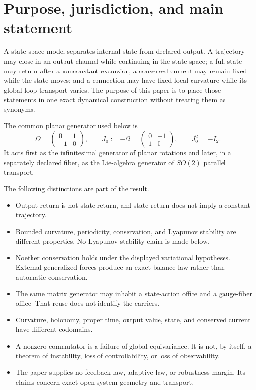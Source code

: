 \documentclass[11pt,letterpaper]{article}
\theoremstyle{dynamicsstyle}
\begin{document}
\tableofcontents
\clearpage

\section{Purpose, jurisdiction, and main statement}

A state-space model separates internal state from declared output.  A trajectory may close in an output channel while continuing in the state space; a full state may return after a nonconstant excursion; a conserved current may remain fixed while the state moves; and a connection may have fixed local curvature while its global loop transport varies.  The purpose of this paper is to place those statements in one exact dynamical construction without treating them as synonyms.

The common planar generator used below is
\[
\Omega=
\begin{pmatrix}
0&1\\[-1mm]
-1&0
\end{pmatrix},
\qquad
J_0:=-\Omega=
\begin{pmatrix}
0&-1\\[-1mm]
1&0
\end{pmatrix},
\qquad
J_0^2=-I_2.
\]
It acts first as the infinitesimal generator of planar rotations and later, in a separately declared fiber, as the Lie-algebra generator of $SO(2)$ parallel transport.

\begin{boundarybox}
The following distinctions are part of the result.
\begin{itemize}
  \item Output return is not state return, and state return does not imply a constant trajectory.
  \item Bounded curvature, periodicity, conservation, and Lyapunov stability are different properties.  No Lyapunov-stability claim is made below.
  \item Noether conservation holds under the displayed variational hypotheses.  External generalized forces produce an exact balance law rather than automatic conservation.
  \item The same matrix generator may inhabit a state-action office and a gauge-fiber office.  That reuse does not identify the carriers.
  \item Curvature, holonomy, proper time, output value, state, and conserved current have different codomains.
  \item A nonzero commutator is a failure of global equivariance.  It is not, by itself, a theorem of instability, loss of controllability, or loss of observability.
  \item The paper supplies no feedback law, adaptive law, or robustness margin.  Its claims concern exact open-system geometry and transport.
\end{itemize}
\end{boundarybox}
\end{document}
